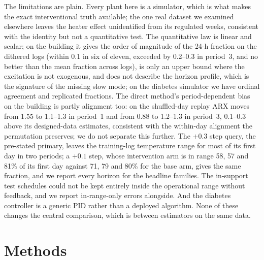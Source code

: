 \documentclass[11pt]{article}
\begin{document}
The limitations are plain. Every plant here is a simulator, which is what makes the exact interventional truth available; the one real dataset we examined elsewhere leaves the heater effect unidentified from its regulated weeks, consistent with the identity but not a quantitative test. The quantitative law is linear and scalar; on the building it gives the order of magnitude of the 24-h fraction on the dithered logs (within 0.1 in six of eleven, exceeded by 0.2--0.3 in period~3, and no better than the mean fraction across logs), is only an upper bound where the excitation is not exogenous, and does not describe the horizon profile, which is the signature of the missing slow mode; on the diabetes simulator we have ordinal agreement and replicated fractions. The direct method's period-dependent bias on the building is partly alignment too: on the shuffled-day replay ARX moves from 1.55 to 1.1--1.3 in period~1 and from 0.88 to 1.2--1.3 in period~3, 0.1--0.3 above its designed-data estimates, consistent with the within-day alignment the permutation preserves; we do not separate this further. The $+0.3$ step query, the pre-stated primary, leaves the training-log temperature range for most of its first day in two periods; a $+0.1$ step, whose intervention arm is in range 58, 57 and 81\% of its first day against 71, 79 and 80\% for the base arm, gives the same fraction, and we report every horizon for the headline families. The in-support test schedules could not be kept entirely inside the operational range without feedback, and we report in-range-only errors alongside. And the diabetes controller is a generic PID rather than a deployed algorithm. None of these changes the central comparison, which is between estimators on the same data.

\section*{Methods}
\end{document}
